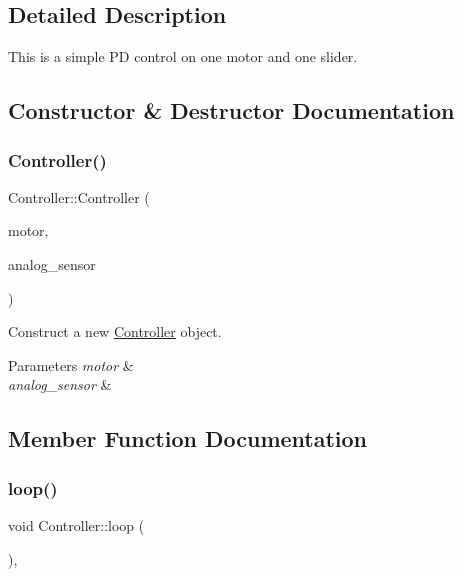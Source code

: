 \subsection{Detailed Description}
This is a simple PD control on one motor and one slider. 

\subsection{Constructor \& Destructor Documentation}
\mbox{\label{classController_aceedb7c8fbd0fab8080fd7273d9dc65d}} 
\subsubsection{\texorpdfstring{Controller()}{Controller()}}
{\footnotesize\ttfamily Controller\+::\+Controller (\begin{DoxyParamCaption}\item[{std\+::shared\+\_\+ptr$<$ \hyperlink{classblmc__drivers_1_1Motor}{blmc\+\_\+drivers\+::\+Motor} $>$}]{motor,  }\item[{std\+::shared\+\_\+ptr$<$ \hyperlink{classblmc__drivers_1_1AnalogSensor}{blmc\+\_\+drivers\+::\+Analog\+Sensor} $>$}]{analog\+\_\+sensor }\end{DoxyParamCaption})\hspace{0.3cm}{\ttfamily [inline]}}



Construct a new \hyperlink{classController}{Controller} object. 


\begin{DoxyParams}{Parameters}
{\em motor} & \\
\hline
{\em analog\+\_\+sensor} & \\
\hline
\end{DoxyParams}


\subsection{Member Function Documentation}
\mbox{\label{classController_a9ec8c2d4a68acccd118537c36894e516}} 
\subsubsection{\texorpdfstring{loop()}{loop()}}
{\footnotesize\ttfamily void Controller\+::loop (\begin{DoxyParamCaption}{ }\end{DoxyParamCaption})\hspace{0.3cm}{\ttfamily [inline]}, {\ttfamily [private]}}



